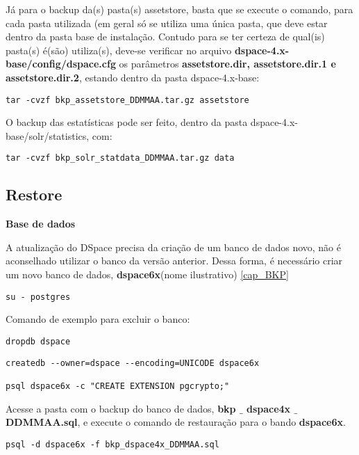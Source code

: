 \documentclass[12pt,hidelinks]{article}
\begin{document}
Já para o backup da(s) pasta(s) assetstore, basta que se execute o comando, para cada pasta utilizada (em geral só se utiliza uma única pasta, que deve estar dentro da pasta base de instalação. Contudo para se ter certeza de qual(is) pasta(s) é(são) utiliza(s), deve-se verificar no arquivo \textbf{dspace-4.x-base/config/dspace.cfg} os parâmetros \textbf{assetstore.dir, assetstore.dir.1 e assetstore.dir.2}, estando dentro da pasta dspace-4.x-base:   

\begin{verbatim}
tar -cvzf bkp_assetstore_DDMMAA.tar.gz assetstore
\end{verbatim}

O backup das estatísticas pode ser feito, dentro da pasta dspace-4.x-base/solr/statistics, com:

\begin{verbatim}
tar -cvzf bkp_solr_statdata_DDMMAA.tar.gz data
\end{verbatim}

\subsection{Restore}

\textbf{Base de dados}
\singlespacing

A atualização do DSpace precisa da criação de um banco de dados novo, não é aconselhado utilizar o banco da versão anterior. Dessa forma, é necessário criar um novo banco de dados, \textbf{dspace6x}(nome ilustrativo) \ref{cap_BKP} 


\begin{verbatim}
su - postgres
\end{verbatim}

Comando de exemplo para excluir o banco:
\begin{verbatim}
dropdb dspace
\end{verbatim}

\begin{verbatim}
createdb --owner=dspace --encoding=UNICODE dspace6x

psql dspace6x -c "CREATE EXTENSION pgcrypto;"
\end{verbatim}

\newpage



Acesse a pasta com o backup do banco de dados, \textbf{bkp $\_$ dspace4x $\_$ DDMMAA.sql}, e execute o comando de restauração para o bando \textbf{dspace6x}.


\begin{verbatim}
psql -d dspace6x -f bkp_dspace4x_DDMMAA.sql
\end{verbatim}
\end{document}
